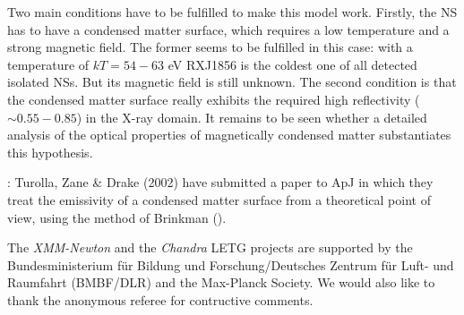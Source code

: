 \documentclass[twocolumn]{aa}
\newcommand{\modi}[1]{{#1}}
\begin{document}
Two main conditions have to be fulfilled to make this model work.
Firstly, the NS has to have a condensed matter surface, which requires
a low temperature and a strong magnetic \modi{field}. The former seems to 
be fulfilled in this \modi{case: with} a temperature of $kT=54-63$ eV
RXJ1856 is the coldest one of all detected isolated NSs. But its magnetic
field is still unknown.
The second condition is that the condensed matter surface
really exhibits the required high reflectivity ($\sim 0.55-0.85$)
in the X-ray domain. It remains to be seen whether a detailed analysis of the
optical properties of magnetically condensed matter substantiates
this hypothesis.

\vskip 0.4cm
\modi{
: 
Turolla, Zane \& Drake (2002) have submitted a paper to ApJ 
in which they treat the emissivity of a condensed matter
surface from a theoretical point of view, using the method of 
Brinkman (\cite{Bri80}).
}
\vskip 0.4cm

\begin{acknowledgements}

 The {\em XMM-Newton} and the {\em Chandra} LETG projects are supported by the 
 Bundesministerium f\"ur Bildung und  Forschung/Deutsches Zentrum f\"{u}r 
 Luft- und Raumfahrt (BMBF/DLR) and the Max-Planck Society.
 We would also like to thank the anonymous referee for contructive comments. 
\end{acknowledgements}
   
\end{document}

